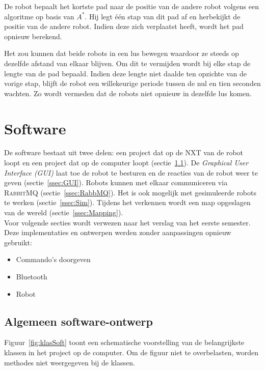 \documentclass[eind]{penoverslag}
\begin{document}
De robot bepaalt het kortste pad naar de positie van de andere robot volgens een algoritme op basis van $A^{*}$. Hij legt \'e\'en stap van dit pad af en herbekijkt de positie van de andere robot. Indien deze zich verplaatst heeft, wordt het pad opnieuw berekend.

Het zou kunnen dat beide robots in een lus bewegen waardoor ze steeds op dezelfde afstand van elkaar blijven. Om dit te vermijden wordt bij elke stap de lengte van de pad bepaald. Indien deze lengte niet daalde ten opzichte van de vorige stap, blijft de robot een willekeurige periode tussen de nul en tien seconden wachten. Zo wordt vermeden dat de robots niet opnieuw in dezelfde lus komen.


\section{Software}
\label{sec:Softw}
De software bestaat uit twee delen: een project dat op de \textsc{NXT} van de robot loopt en een project dat op de computer loopt (sectie~\ref{ssec:Sdesign}). De \textit{Graphical User Interface (GUI)} laat toe de robot te besturen en de reacties van de robot weer te geven (sectie~\ref{ssec:GUI}). Robots kunnen met elkaar communiceren via \textsc{RabbitMQ} (sectie~\ref{ssec:RabbMQ}). Het is ook mogelijk met gesimuleerde robots te werken (sectie~\ref{ssec:Sim}). Tijdens het verkennen wordt een map opgeslagen van de wereld (sectie~\ref{ssec:Mapping}).\\

Voor volgende secties wordt verwezen naar het verslag van het eerste semester. Deze implementaties en ontwerpen werden zonder aanpassingen opnieuw gebruikt:

\begin{itemize}
\item Commando's doorgeven
\item Bluetooth
\item Robot
\end{itemize}

\subsection{Algemeen software-ontwerp}
\label{ssec:Sdesign}
Figuur~\ref{fig:klasSoft} toont een schematische voorstelling van de belangrijkste klassen in het project op de computer. Om de figuur niet te overbelasten, worden methodes niet weergegeven bij de klassen.\\
\end{document}
